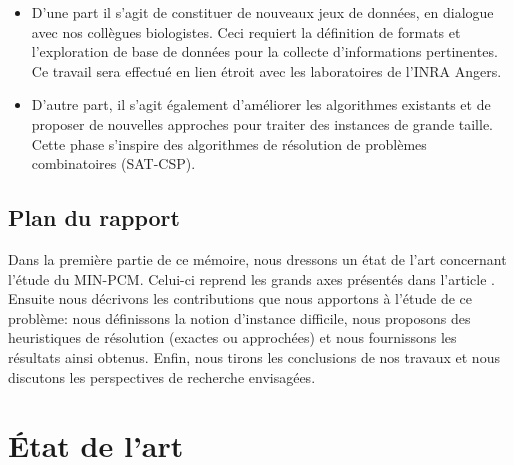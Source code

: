 \begin{itemize}
\item D'une part il s'agit de constituer de nouveaux jeux de données, en dialogue avec nos collègues
biologistes. Ceci requiert la définition de formats et l'exploration de base de données pour la collecte
d'informations pertinentes. Ce travail sera effectué en lien étroit avec les laboratoires de l'INRA
Angers.
\item D'autre part, il s'agit également d'améliorer les algorithmes existants et de proposer de nouvelles
approches pour traiter des instances de grande taille. Cette phase s'inspire des algorithmes de
résolution de problèmes combinatoires (SAT-CSP).
\end{itemize}

\subsection*{Plan du rapport}
Dans la première partie de ce mémoire, nous dressons un état de l'art concernant l'étude du MIN-PCM. Celui-ci reprend les grands axes présentés dans l'article \cite{Chhel2013}. Ensuite nous décrivons les contributions que nous apportons à l'étude de ce problème: nous définissons la notion d'instance difficile, nous proposons des heuristiques de résolution (exactes ou approchées) et nous fournissons les résultats ainsi obtenus. Enfin, nous tirons les conclusions de nos travaux et nous discutons les perspectives de recherche envisagées.

\newpage
\setcounter{tocdepth}{3}
\tableofcontents
\newpage

\section{État de l'art}






